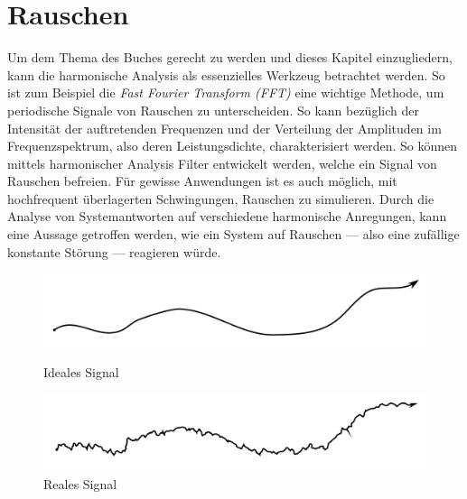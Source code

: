 %
%
%
%

\section{Rauschen\label{brown:Rauschen}}

Um dem Thema des Buches gerecht zu werden und dieses Kapitel einzugliedern, kann die harmonische Analysis als essenzielles Werkzeug betrachtet werden. So ist zum Beispiel die \textit{Fast Fourier Transform (FFT)} eine wichtige Methode, um periodische Signale von Rauschen zu unterscheiden. So kann bezüglich der Intensität der auftretenden Frequenzen und der Verteilung der Amplituden im Frequenzspektrum, also deren Leistungsdichte, charakterisiert werden. 
So können mittels harmonischer Analysis Filter entwickelt werden, welche ein Signal von Rauschen befreien. Für gewisse Anwendungen ist es auch möglich, mit hochfrequent überlagerten Schwingungen, Rauschen zu simulieren. Durch die Analyse von Systemantworten auf verschiedene harmonische Anregungen, kann eine Aussage getroffen werden, wie ein System auf Rauschen --- also eine zufällige konstante Störung --- reagieren würde. 

\begin{figure}
	\centering
	\begin{minipage}{0.48\textwidth}
		\centering
		\includegraphics[width=\textwidth]{papers/brown/images/idealSignal2.png}
		\caption{Ideales Signal}
		\label{idealSignal}
	\end{minipage}
	\begin{minipage}{0.48\textwidth}
		\centering
		\includegraphics[width=\textwidth]{papers/brown/images/realSignal2.png}
		\caption{Reales Signal}
		\label{realSignal}
	\end{minipage}
\end{figure}

